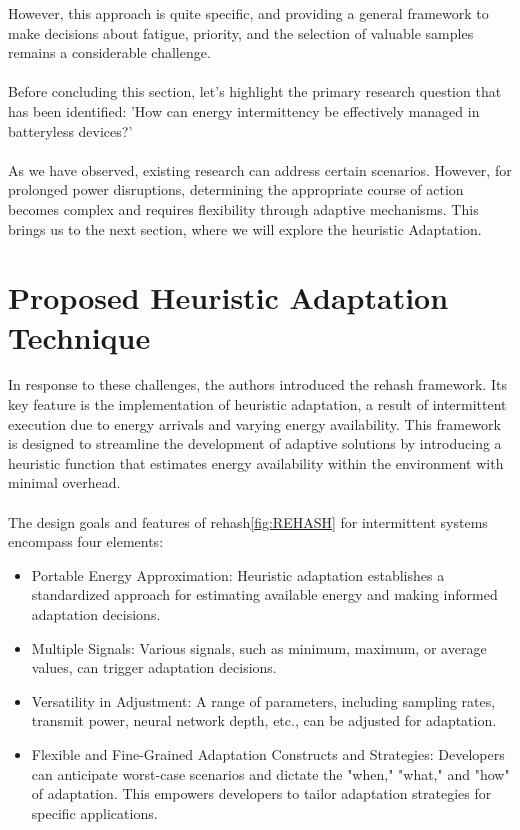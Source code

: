         \noindent
        However, this approach is quite specific, and providing a general framework to make decisions about fatigue, priority, and the selection of valuable samples remains a considerable challenge\cite{basedArticle}.

    \paragraph{}
        Before concluding this section, let's highlight the primary research question that has been identified: 'How can energy intermittency be effectively managed in batteryless devices?'

    \paragraph{}
        As we have observed, existing research can address certain scenarios. However, for prolonged power disruptions, determining the appropriate course of action becomes complex and requires flexibility through adaptive mechanisms. This brings us to the next section, where we will explore the \gls{heuristic} Adaptation.

\newpage
\section{Proposed Heuristic Adaptation Technique}
        In response to these challenges, the authors introduced the \gls{rehash} framework. Its key feature is the implementation of \gls{heuristic} adaptation, a result of intermittent execution due to energy arrivals and varying energy availability\cite{basedArticle}. This framework is designed to streamline the development of adaptive solutions by introducing a \gls{heuristic} function that estimates energy availability within the environment with minimal overhead.
        
    \paragraph{}
    The design goals and features of \gls{rehash}\ref{fig:REHASH} for intermittent systems encompass four elements:
    \begin{itemize}
        \item Portable Energy Approximation: Heuristic adaptation establishes a standardized approach for estimating available energy and making informed adaptation decisions.
        \item Multiple Signals: Various signals, such as minimum, maximum, or average values, can trigger adaptation decisions.
        \item Versatility in Adjustment: A range of parameters, including sampling rates, transmit power, neural network depth, etc., can be adjusted for adaptation.
        \item Flexible and Fine-Grained Adaptation Constructs and Strategies: Developers can anticipate worst-case scenarios and dictate the "when," "what," and "how" of adaptation. This empowers developers to tailor adaptation strategies for specific applications.
    \end{itemize}
    
